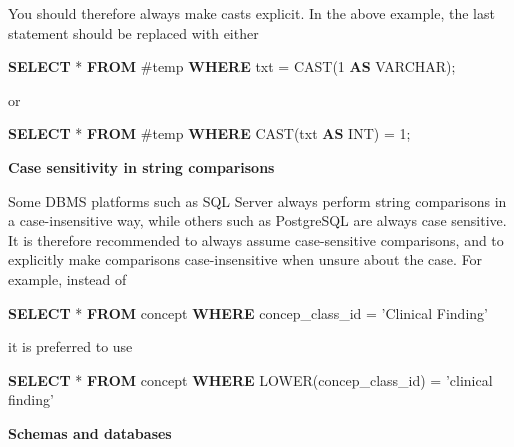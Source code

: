 \documentclass[11pt]{book}
\newenvironment{Shaded}{\begin{snugshade}}{\end{snugshade}}
\newcommand{\KeywordTok}[1]{\textcolor[rgb]{0.13,0.29,0.53}{\textbf{#1}}}
\newcommand{\DataTypeTok}[1]{\textcolor[rgb]{0.13,0.29,0.53}{#1}}
\newcommand{\DecValTok}[1]{\textcolor[rgb]{0.00,0.00,0.81}{#1}}
\newcommand{\StringTok}[1]{\textcolor[rgb]{0.31,0.60,0.02}{#1}}
\newcommand{\FunctionTok}[1]{\textcolor[rgb]{0.00,0.00,0.00}{#1}}
\newcommand{\NormalTok}[1]{#1}
\begin{document}
You should therefore always make casts explicit. In the above example,
the last statement should be replaced with either

\begin{Shaded}
\begin{Highlighting}[]
\KeywordTok{SELECT}\NormalTok{ * }\KeywordTok{FROM}\NormalTok{ #temp }\KeywordTok{WHERE}\NormalTok{ txt = }\FunctionTok{CAST}\NormalTok{(}\DecValTok{1} \KeywordTok{AS} \DataTypeTok{VARCHAR}\NormalTok{);}
\end{Highlighting}
\end{Shaded}

or

\begin{Shaded}
\begin{Highlighting}[]
\KeywordTok{SELECT}\NormalTok{ * }\KeywordTok{FROM}\NormalTok{ #temp }\KeywordTok{WHERE} \FunctionTok{CAST}\NormalTok{(txt }\KeywordTok{AS} \DataTypeTok{INT}\NormalTok{) = }\DecValTok{1}\NormalTok{;}
\end{Highlighting}
\end{Shaded}

\textbf{Case sensitivity in string comparisons}

Some DBMS platforms such as SQL Server always perform string comparisons
in a case-insensitive way, while others such as PostgreSQL are always
case sensitive. It is therefore recommended to always assume
case-sensitive comparisons, and to explicitly make comparisons
case-insensitive when unsure about the case. For example, instead of

\begin{Shaded}
\begin{Highlighting}[]
\KeywordTok{SELECT}\NormalTok{ * }\KeywordTok{FROM}\NormalTok{ concept }\KeywordTok{WHERE}\NormalTok{ concep_class_id = }\StringTok{'Clinical Finding'}
\end{Highlighting}
\end{Shaded}

it is preferred to use

\begin{Shaded}
\begin{Highlighting}[]
\KeywordTok{SELECT}\NormalTok{ * }\KeywordTok{FROM}\NormalTok{ concept }\KeywordTok{WHERE} \FunctionTok{LOWER}\NormalTok{(concep_class_id) = }\StringTok{'clinical finding'}
\end{Highlighting}
\end{Shaded}

\textbf{Schemas and databases}
\end{document}
